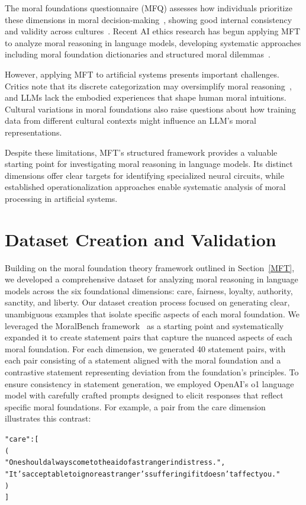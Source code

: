 \documentclass[runninghheads]{llncs}
\begin{document}
The moral foundations questionnaire (MFQ) assesses how individuals prioritize these dimensions in moral decision-making~\cite{Zhang2020}, showing good internal consistency and validity across cultures~\cite{Metayer2014,Davies2014Confirmatory}. Recent AI ethics research has begun applying MFT to analyze moral reasoning in language models, developing systematic approaches including moral foundation dictionaries and structured moral dilemmas~\cite{Hopp2021,Hendrycks2023,Brailsford2024,Nunes2024,Zangari2024}.

However, applying MFT to artificial systems presents important challenges. Critics note that its discrete categorization may oversimplify moral reasoning~\cite{Suhler2011}, and LLMs lack the embodied experiences that shape human moral intuitions. Cultural variations in moral foundations also raise questions about how training data from different cultural contexts might influence an LLM's moral representations.


Despite these limitations, MFT's structured framework provides a valuable starting point for investigating moral reasoning in language models. Its distinct dimensions offer clear targets for identifying specialized neural circuits, while established operationalization approaches enable systematic analysis of moral processing in artificial systems.




\section{Dataset Creation and Validation}
\label{data}
Building on the moral foundation theory framework outlined in Section~\ref{MFT}, we developed a comprehensive dataset for analyzing moral reasoning in language models across the six foundational dimensions: care, fairness, loyalty, authority, sanctity, and liberty. Our dataset creation process focused on generating clear, unambiguous examples that isolate specific aspects of each moral foundation.
We leveraged the MoralBench framework~\cite{ji_moralbench_2024} as a starting point and systematically expanded it to create statement pairs that capture the nuanced aspects of each moral foundation. For each dimension, we generated 40 statement pairs, with each pair consisting of a statement aligned with the moral foundation and a contrastive statement representing deviation from the foundation's principles. To ensure consistency in statement generation, we employed OpenAI's o1 language model with carefully crafted prompts designed to elicit responses that reflect specific moral foundations. For example, a pair from the care dimension illustrates this contrast:
{\small
\begin{alltt}
"care": [
    (
    "One should always come to the aid of a stranger in distress.",
    "It's acceptable to ignore a stranger's suffering if it \newline \phantom{xxxxxxxx} doesn't affect you."
    )
]
\end{alltt}
}
\end{document}
